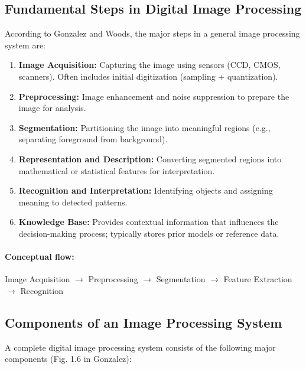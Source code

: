 \documentclass[12pt,a4paper]{AnantDocumentation}
\begin{document}
\subsection{Fundamental Steps in Digital Image Processing}
According to Gonzalez and Woods, the major steps in a general image processing system are:
\begin{enumerate}
\item \textbf{Image Acquisition:} Capturing the image using sensors (CCD, CMOS, scanners). Often includes initial digitization (sampling + quantization).
\item \textbf{Preprocessing:} Image enhancement and noise suppression to prepare the image for analysis.
\item \textbf{Segmentation:} Partitioning the image into meaningful regions (e.g., separating foreground from background).
\item \textbf{Representation and Description:} Converting segmented regions into mathematical or statistical features for interpretation.
\item \textbf{Recognition and Interpretation:} Identifying objects and assigning meaning to detected patterns.
\item \textbf{Knowledge Base:} Provides contextual information that influences the decision-making process; typically stores prior models or reference data.
\end{enumerate}

\paragraph{Conceptual flow:}
\begin{center}
Image Acquisition $\rightarrow$ Preprocessing $\rightarrow$ Segmentation $\rightarrow$ Feature Extraction $\rightarrow$ Recognition
\end{center}

\subsection{Components of an Image Processing System}
A complete digital image processing system consists of the following major components (Fig. 1.6 in Gonzalez):
\end{document}
